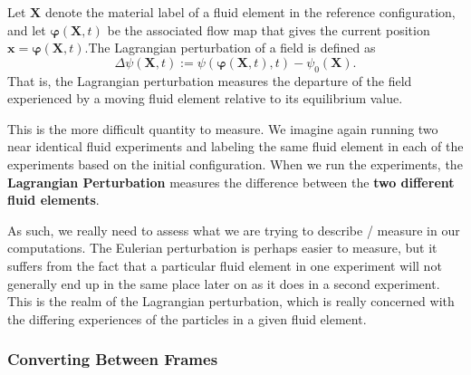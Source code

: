 \vspace{0.5cm}
\begin{definition}
Let \( \mathbf{X} \) denote the material label of a fluid element in the reference configuration, and let \( \boldsymbol{\varphi}(\mathbf{X},t) \) be the associated flow map that gives the current position \( \mathbf{x} = \boldsymbol{\varphi}(\mathbf{X},t) \).The Lagrangian perturbation of a field is defined as
\[
\Delta \psi(\mathbf{X},t) := \psi(\boldsymbol{\varphi}(\mathbf{X},t),t) - \psi_0(\mathbf{X}).
\]
That is, the Lagrangian perturbation measures the departure of the field experienced by a moving fluid element relative to its equilibrium value.
\par
This is the more difficult quantity to measure. We imagine again running two near identical fluid experiments and labeling the same fluid element in each of the experiments based on the initial configuration. When we run the experiments, the \textbf{Lagrangian Perturbation} measures the difference between the \textbf{two different fluid elements}.
\end{definition}
\vspace{0.5cm}
As such, we really need to assess what we are trying to describe / measure in our computations. The Eulerian perturbation is perhaps easier to measure, but it suffers from the fact that a particular fluid element in one experiment will not generally end up in the same place later on as it does in a second experiment. This is the realm of the Lagrangian perturbation, which is really concerned with the differing experiences of the particles in a given fluid element.

\subsubsection*{Converting Between Frames}

